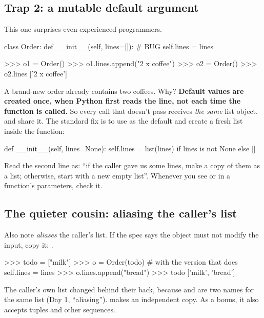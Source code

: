 \documentclass[10pt,a4paper]{article}
\begin{document}
\subsection{Trap 2: a mutable default argument}
This one surprises even experienced programmers.
\begin{pycode}
class Order:
    def __init__(self, lines=[]):      # BUG
        self.lines = lines
\end{pycode}
\begin{txtcode}
>>> o1 = Order()
>>> o1.lines.append("2 x coffee")
>>> o2 = Order()
>>> o2.lines
['2 x coffee']
\end{txtcode}
A brand-new order already contains two coffees. Why? \textbf{Default values are created once, when Python first reads the  line, not each time the function is called.} So every call that doesn’t pass  receives \emph{the same} list object.  and  share it.
The standard fix is to use  as the default and create a fresh list inside the function:
\begin{pycode}
    def __init__(self, lines=None):
        self.lines = list(lines) if lines is not None else []
\end{pycode}
Read the second line as: “if the caller gave us some lines, make a copy of them as a list; otherwise, start with a new empty list”. Whenever you see \code{=\allowbreak{}[]} or \code{=\allowbreak{}\{\}} in a function’s parameters, check it.
\subsection{The quieter cousin: aliasing the caller’s list}
\begin{notebox}
Also note  \emph{aliases} the caller’s list. If the spec says the object must not modify the input, copy it: .
\end{notebox}
\begin{txtcode}
>>> todo = ["milk"]
>>> o = Order(todo)                 # with the version that does self.lines = lines
>>> o.lines.append("bread")
>>> todo
['milk', 'bread']
\end{txtcode}
The caller’s own list changed behind their back, because  and  are two names for the same list (Day 1, “aliasing”).  makes an independent copy. As a bonus, it also accepts tuples and other sequences.
\setcounter{section}{2}
\end{document}
